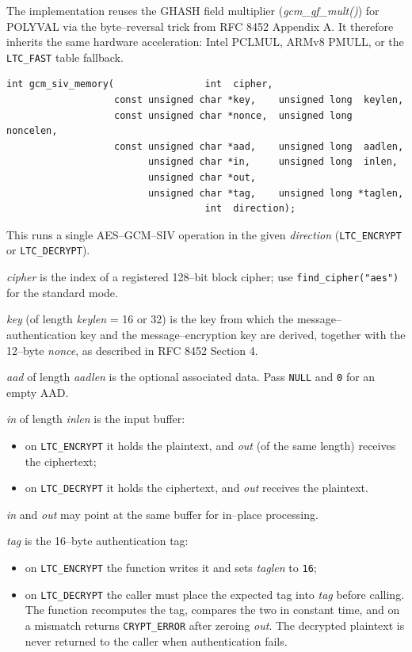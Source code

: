 \documentclass[synpaper]{book}
\begin{document}
The implementation reuses the GHASH field multiplier (\textit{gcm\_gf\_mult()}) for POLYVAL via the byte--reversal trick from RFC 8452 Appendix A.
It therefore inherits the same hardware acceleration: Intel PCLMUL, ARMv8 PMULL, or the \texttt{LTC\_FAST} table fallback.

\begin{verbatim}
int gcm_siv_memory(                int  cipher,
                   const unsigned char *key,    unsigned long  keylen,
                   const unsigned char *nonce,  unsigned long  noncelen,
                   const unsigned char *aad,    unsigned long  aadlen,
                         unsigned char *in,     unsigned long  inlen,
                         unsigned char *out,
                         unsigned char *tag,    unsigned long *taglen,
                                   int  direction);
\end{verbatim}

This runs a single AES--GCM--SIV operation in the given \textit{direction} (\texttt{LTC\_ENCRYPT} or \texttt{LTC\_DECRYPT}).

\textit{cipher} is the index of a registered 128--bit block cipher; use \texttt{find\_cipher("aes")} for the standard mode.

\textit{key} (of length \textit{keylen} = 16 or 32) is the key from which the message--authentication key and the message--encryption key
are derived, together with the 12--byte \textit{nonce}, as described in RFC 8452 Section 4.

\textit{aad} of length \textit{aadlen} is the optional associated data. Pass \texttt{NULL} and \texttt{0} for an empty AAD.

\textit{in} of length \textit{inlen} is the input buffer:
\begin{itemize}
   \item on \texttt{LTC\_ENCRYPT} it holds the plaintext, and \textit{out} (of the same length) receives the ciphertext;
   \item on \texttt{LTC\_DECRYPT} it holds the ciphertext, and \textit{out} receives the plaintext.
\end{itemize}

\textit{in} and \textit{out} may point at the same buffer for in--place processing.

\textit{tag} is the 16--byte authentication tag:
\begin{itemize}
   \item on \texttt{LTC\_ENCRYPT} the function writes it and sets \textit{taglen} to \texttt{16};
   \item on \texttt{LTC\_DECRYPT} the caller must place the expected tag into \textit{tag} before calling. The function recomputes the tag,
         compares the two in constant time, and on a mismatch returns \texttt{CRYPT\_ERROR} after zeroing \textit{out}. The decrypted
         plaintext is never returned to the caller when authentication fails.
\end{itemize}
\end{document}
